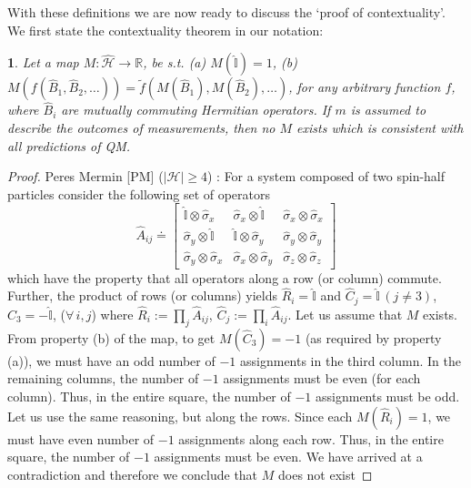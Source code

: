 \documentclass[doublecol,british]{epl2}
\theoremstyle{plain}
\theoremstyle{plain}
\newtheorem*{thm*}{\protect\theoremname}
\theoremstyle{definition}
\theoremstyle{remark}
\theoremstyle{remark}
\theoremstyle{remark}
\theoremstyle{plain}
\theoremstyle{plain}
\theoremstyle{plain}
\theoremstyle{definition}
\theoremstyle{definition}
\providecommand{\theoremname}{Theorem}
\begin{document}
With these definitions we are now ready to discuss
the `proof of contextuality'. We first state the
contextuality theorem in our notation:
\begin{thm*} Let a map
$M:\hat{\mathcal{H}}\to\mathbb{R}$, be s.t. (a)
$M(\hat{\mathbb{I}})=1$, (b)
$M(f(\hat{B}_{1},\hat{B}_{2},\dots))=\tilde
f(M(\hat{B}_{1}),M(\hat{B}_{2}),\dots)$, for any
arbitrary function $f$, where $\hat{B}_{i}$ are
mutually commuting Hermitian operators. If $m$ is
assumed to describe the outcomes of measurements,
then no $M$ exists which is consistent with all
predictions of QM. 
\label{thm:KS}
\end{thm*}

\begin{proof} Peres Mermin [PM]
($\left|\mathcal{H}\right|\ge4$)
\cite{Peres,Mermin}:
For a system composed of two spin-half particles 
consider the following set of operators 
\begin{equation*}
\hat{A}_{ij}\doteq\left[\begin{array}{ccc}
\hat{\mathbb{I}}\otimes\hat{\sigma}_{x} &
\hat{\sigma}_{x}\otimes\hat{\mathbb{I}} &
\hat{\sigma}_{x}\otimes\hat{\sigma}_{x}\\
\hat{\sigma}_{y}\otimes\hat{\mathbb{I}} &
\hat{\mathbb{I}}\otimes\hat{\sigma}_{y} &
\hat{\sigma}_{y}\otimes\hat{\sigma}_{y}\\
\hat{\sigma}_{y}\otimes\hat{\sigma}_{x} &
\hat{\sigma}_{x}\otimes\hat{\sigma}_{y} &
\hat{\sigma}_{z}\otimes\hat{\sigma}_{z}
\end{array}\right]
\end{equation*}
which have the property that
all operators along a row (or column) commute. Further,
the product of rows (or columns) yields
$\hat{R}_{i}=\hat{\mathbb{I}}$ and
$\hat{C}_{j}=\hat{\mathbb{I}}\,(j\neq3)$,
$\hat{C}_{3}=-\hat{\mathbb{I}}$, ($\forall\,i,j$) where
$\hat{R}_{i}:=\prod_{j}\hat{A}_{ij}$,
$\hat{C}_{j}:=\prod_{i}\hat{A}_{ij}$. Let us
assume that $M$ exists. From property (b) of the
map, to get $M(\hat{C}_{3})=-1$ (as required by
property (a)), we must have an odd number of $-1$
assignments in the third column. In the remaining
columns, the number of $-1$ assignments must be
even (for each column). Thus, in the entire
square, the number of $-1$ assignments must be
odd. Let us use the same reasoning, but along the
rows. Since each $M(\hat{R}_{i})=1$, we must have
even number of $-1$ assignments along each row.
Thus, in the entire square, the number of $-1$
assignments must be even. We have arrived at a
contradiction and therefore we conclude 
that $M$ does not exist
\end{proof}
\end{document}
